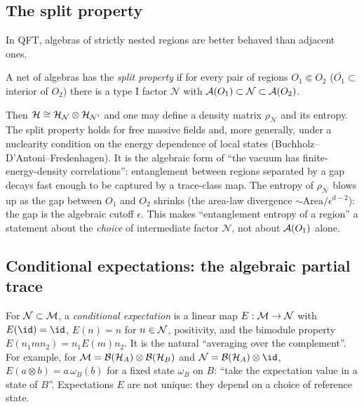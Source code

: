\subsection{The split property}

In QFT, algebras of strictly nested regions are better behaved than adjacent ones.

\begin{definition}
A net of algebras has the \emph{split property} if for every pair of regions $O_1\Subset O_2$ ($\overline{O_1}\subset$ interior of $O_2$) there is a type I factor $\mathcal N$ with $\mathcal{A}(O_1)\subset\mathcal N\subset\mathcal{A}(O_2)$.
\end{definition}

Then $\mathcal{H}\cong\mathcal{H}_{\mathcal N}\otimes\mathcal{H}_{\mathcal N'}$ and one may define a density matrix $\rho_{\mathcal N}$ and its entropy. The split property holds for free massive fields and, more generally, under a nuclearity condition on the energy dependence of local states (Buchholz--D'Antoni--Fredenhagen). It is the algebraic form of ``the vacuum has finite-energy-density correlations'': entanglement between regions separated by a gap decays fast enough to be captured by a trace-class map. The entropy of $\rho_{\mathcal N}$ blows up as the gap between $O_1$ and $O_2$ shrinks (the area-law divergence $\sim\mathrm{Area}/\epsilon^{d-2}$): the gap is the algebraic cutoff $\epsilon$. This makes ``entanglement entropy of a region'' a statement about the \emph{choice} of intermediate factor $\mathcal N$, not about $\mathcal{A}(O_1)$ alone.

\subsection{Conditional expectations: the algebraic partial trace}

For $\mathcal{N}\subset\mathcal{M}$, a \emph{conditional expectation} is a linear map $E:\mathcal{M}\to\mathcal{N}$ with $E(\id)=\id$, $E(n)=n$ for $n\in\mathcal{N}$, positivity, and the bimodule property $E(n_1mn_2)=n_1E(m)n_2$. It is the natural ``averaging over the complement''. For example, for $\mathcal{M}=\mathcal{B}(\mathcal{H}_A)\otimes\mathcal{B}(\mathcal{H}_B)$ and $\N=\Bnd{\HH_A}\otimes\id$, $E(a\otimes b)=a\,\omega_B(b)$ for a fixed state $\omega_B$ on $B$: ``take the expectation value in a state of $B$''. Expectations $E$ are not unique: they depend on a choice of reference state.

